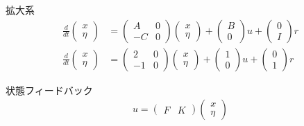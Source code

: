 拡大系
\begin{align*}
	\frac{d}{dt}
	\left (
	\begin{array}{c}
	 x \\ \eta 
	\end{array}
	\right )
	& = 
	\left (
	\begin{array}{cc}
	 A & 0 \\
	 -C& 0
	\end{array}
	\right )
	\left (
	\begin{array}{c}
	 x \\ \eta 
	\end{array}
	\right )
	+
	\left (
	\begin{array}{c}
	 B \\ 0 
	\end{array}
	\right )
	u
	+
	\left (
	\begin{array}{c}
	 0 \\ I 
	\end{array}
	\right )
	r
\\
	\frac{d}{dt}
	\left (
	\begin{array}{c}
	 x \\ \eta 
	\end{array}
	\right )
	& = 
	\left (
	\begin{array}{cc}
	 2 & 0 \\
	 -1& 0
	\end{array}
	\right )
	\left (
	\begin{array}{c}
	 x \\ \eta 
	\end{array}
	\right )
	+
	\left (
	\begin{array}{c}
	 1 \\ 0 
	\end{array}
	\right )
	u
	+
	\left (
	\begin{array}{c}
	 0 \\ 1 
	\end{array}
	\right )
	r
\end{align*}

状態フィードバック
\begin{align*}
	u = \left ( \begin{array}{cc}
			F & K \end{array} \right )
		\left (
		\begin{array}{c}
		 x \\ \eta 
		\end{array}
		\right )
\end{align*}

